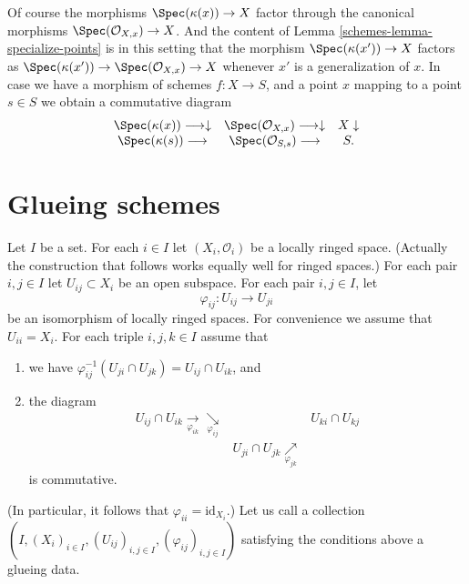 Of course the morphisms $\Spec(\kappa(x)) \to X$
factor through the canonical morphisms
$\Spec(\mathcal{O}_{X, x}) \to X$.
And the content of Lemma \ref{schemes-lemma-specialize-points} is in
this setting that the morphism $\Spec(\kappa(x')) \to X$
factors as
$\Spec(\kappa(x')) \to \Spec(\mathcal{O}_{X, x}) \to X$
whenever $x'$ is a generalization of $x$.
In case we have a morphism of schemes $f : X \to S$,
and a point $x$ mapping to a point $s \in S$ we obtain
a commutative diagram
$$
\begin{array}{ccc}\Spec(\kappa(x)) \longrightarrow\downarrow & \Spec(\mathcal{O}_{X, x}) \longrightarrow\downarrow & X \downarrow \\ \Spec(\kappa(s)) \longrightarrow & \Spec(\mathcal{O}_{S, s}) \longrightarrow & S.\end{array}
$$

\section{Glueing schemes}
\label{schemes-section-glueing-schemes}
Let $I$ be a set.
For each $i \in I$ let $(X_i, \mathcal{O}_i)$ be
a locally ringed space. (Actually the construction that
follows works equally well for ringed spaces.)
For each pair $i, j \in I$ let $U_{ij} \subset X_i$
be an open subspace.
For each pair $i, j \in I$, let
$$
\varphi_{ij} : U_{ij} \to U_{ji}
$$
be an isomorphism of locally ringed spaces.
For convenience we assume that $U_{ii} = X_i$.
For each triple $i, j, k \in I$ assume that
\begin{enumerate}
\item we have
$\varphi_{ij}^{-1}(U_{ji} \cap U_{jk}) =  U_{ij} \cap U_{ik}$, and
\item the diagram
$$
\begin{array}{ccc}U_{ij} \cap U_{ik} \underset{\varphi_{ik}}{\longrightarrow}\underset{\varphi_{ij}}{\searrow} &  & U_{ki} \cap U_{kj} \\  & U_{ji} \cap U_{jk} \underset{\varphi_{jk}}{\nearrow} & \end{array}
$$
is commutative.
\end{enumerate}
(In particular, it follows that $\varphi_{ii} = \text{id}_{X_i}$.)
Let us call a collection
$(I, (X_i)_{i\in I}, (U_{ij})_{i, j\in I}, (\varphi_{ij})_{i, j\in I})$
satisfying the conditions above a glueing data.

